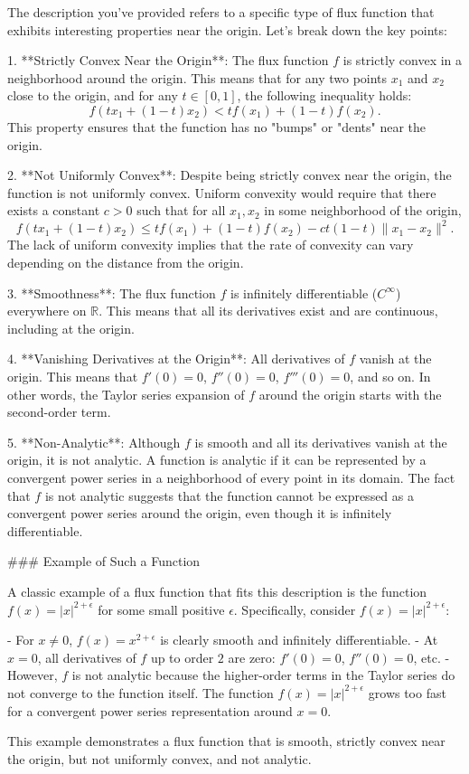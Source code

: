 The description you've provided refers to a specific type of flux function that exhibits interesting properties near the origin. Let's break down the key points:

1. **Strictly Convex Near the Origin**: The flux function \( f \) is strictly convex in a neighborhood around the origin. This means that for any two points \( x_1 \) and \( x_2 \) close to the origin, and for any \( t \in [0, 1] \), the following inequality holds:
   \[
   f(tx_1 + (1-t)x_2) < tf(x_1) + (1-t)f(x_2).
   \]
   This property ensures that the function has no "bumps" or "dents" near the origin.

2. **Not Uniformly Convex**: Despite being strictly convex near the origin, the function is not uniformly convex. Uniform convexity would require that there exists a constant \( c > 0 \) such that for all \( x_1, x_2 \) in some neighborhood of the origin,
   \[
   f(tx_1 + (1-t)x_2) \leq tf(x_1) + (1-t)f(x_2) - c t(1-t) \|x_1 - x_2\|^2.
   \]
   The lack of uniform convexity implies that the rate of convexity can vary depending on the distance from the origin.

3. **Smoothness**: The flux function \( f \) is infinitely differentiable (\( C^\infty \)) everywhere on \( \mathbb{R} \). This means that all its derivatives exist and are continuous, including at the origin.

4. **Vanishing Derivatives at the Origin**: All derivatives of \( f \) vanish at the origin. This means that \( f'(0) = 0 \), \( f''(0) = 0 \), \( f'''(0) = 0 \), and so on. In other words, the Taylor series expansion of \( f \) around the origin starts with the second-order term.

5. **Non-Analytic**: Although \( f \) is smooth and all its derivatives vanish at the origin, it is not analytic. A function is analytic if it can be represented by a convergent power series in a neighborhood of every point in its domain. The fact that \( f \) is not analytic suggests that the function cannot be expressed as a convergent power series around the origin, even though it is infinitely differentiable.

### Example of Such a Function

A classic example of a flux function that fits this description is the function \( f(x) = |x|^{2+\epsilon} \) for some small positive \( \epsilon \). Specifically, consider \( f(x) = |x|^{2+\epsilon} \):

- For \( x \neq 0 \), \( f(x) = x^{2+\epsilon} \) is clearly smooth and infinitely differentiable.
- At \( x = 0 \), all derivatives of \( f \) up to order \( 2 \) are zero: \( f'(0) = 0 \), \( f''(0) = 0 \), etc.
- However, \( f \) is not analytic because the higher-order terms in the Taylor series do not converge to the function itself. The function \( f(x) = |x|^{2+\epsilon} \) grows too fast for a convergent power series representation around \( x = 0 \).

This example demonstrates a flux function that is smooth, strictly convex near the origin, but not uniformly convex, and not analytic.